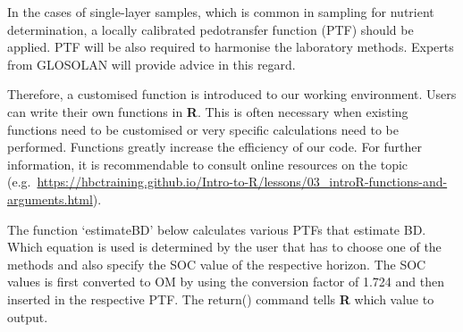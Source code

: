 \documentclass[
  10pt,
  b5paper,
  oneside]{book}
\begin{document}
In the cases of single-layer samples, which is common in sampling for nutrient determination, a locally calibrated pedotransfer function (PTF) should be applied. PTF will be also required to harmonise the laboratory methods. Experts from GLOSOLAN will provide advice in this regard.

Therefore, a customised function is introduced to our working environment. Users can write their own functions in \textbf{R}. This is often necessary when existing functions need to be customised or very specific calculations need to be performed. Functions greatly increase the efficiency of our code. For further information, it is recommendable to consult online resources on the topic (e.g.~\url{https://hbctraining.github.io/Intro-to-R/lessons/03_introR-functions-and-arguments.html}).

The function `estimateBD' below calculates various PTFs that estimate BD. Which equation is used is determined by the user that has to choose one of the methods and also specify the SOC value of the respective horizon. The SOC values is first converted to OM by using the conversion factor of 1.724 and then inserted in the respective PTF. The return() command tells \textbf{R} which value to output.
\end{document}
